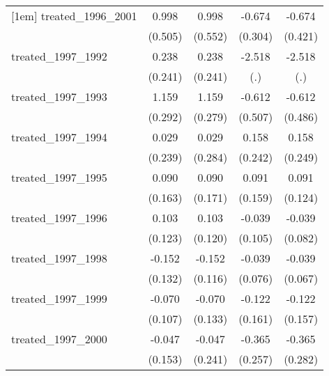 {\begin{tabular}{l*{4}{c}}
[1em]
treated\_1996\_2001&       0.998\sym{*}  &       0.998         &      -0.674\sym{*}  &      -0.674         \\
            &     (0.505)         &     (0.552)         &     (0.304)         &     (0.421)         \\
[1em]
treated\_1997\_1992&       0.238         &       0.238         &      -2.518         &      -2.518         \\
            &     (0.241)         &     (0.241)         &         (.)         &         (.)         \\
[1em]
treated\_1997\_1993&       1.159\sym{***}&       1.159\sym{***}&      -0.612         &      -0.612         \\
            &     (0.292)         &     (0.279)         &     (0.507)         &     (0.486)         \\
[1em]
treated\_1997\_1994&       0.029         &       0.029         &       0.158         &       0.158         \\
            &     (0.239)         &     (0.284)         &     (0.242)         &     (0.249)         \\
[1em]
treated\_1997\_1995&       0.090         &       0.090         &       0.091         &       0.091         \\
            &     (0.163)         &     (0.171)         &     (0.159)         &     (0.124)         \\
[1em]
treated\_1997\_1996&       0.103         &       0.103         &      -0.039         &      -0.039         \\
            &     (0.123)         &     (0.120)         &     (0.105)         &     (0.082)         \\
[1em]
treated\_1997\_1998&      -0.152         &      -0.152         &      -0.039         &      -0.039         \\
            &     (0.132)         &     (0.116)         &     (0.076)         &     (0.067)         \\
[1em]
treated\_1997\_1999&      -0.070         &      -0.070         &      -0.122         &      -0.122         \\
            &     (0.107)         &     (0.133)         &     (0.161)         &     (0.157)         \\
[1em]
treated\_1997\_2000&      -0.047         &      -0.047         &      -0.365         &      -0.365         \\
            &     (0.153)         &     (0.241)         &     (0.257)         &     (0.282)         \\

\end{tabular}}
